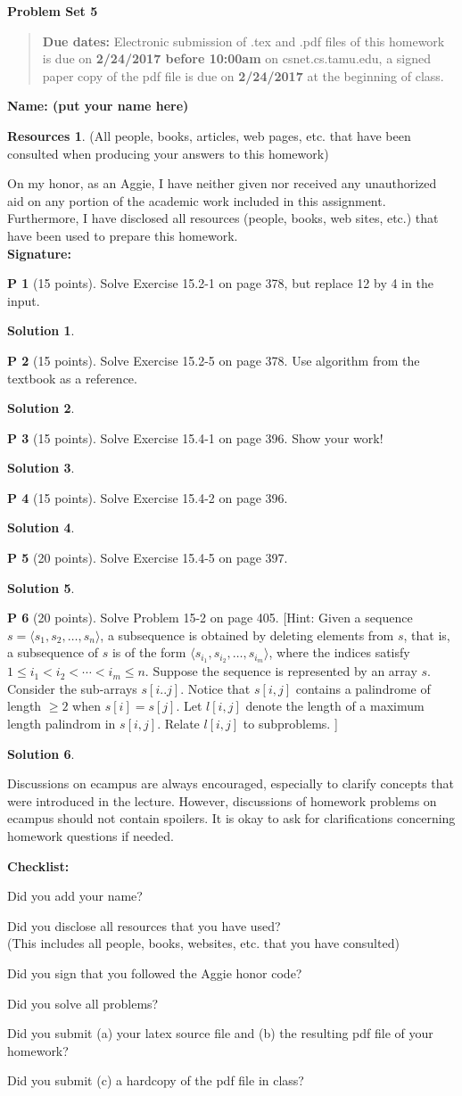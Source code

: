 \documentclass{article}
\theoremstyle{definition}
\newtheorem{problem}{P}
\newtheorem*{solution}{Solution}
\newtheorem*{resources}{Resources}
\newcommand{\name}[1]{\noindent\textbf{Name: #1}}
\newcommand{\honor}{\noindent On my honor, as an Aggie, I have neither
  given nor received any unauthorized aid on any portion of the
  academic work included in this assignment. Furthermore, I have
  disclosed all resources (people, books, web sites, etc.) that have
  been used to prepare this homework. \\[1ex]
 \textbf{Signature:} \underline{\hspace*{5cm}} }
\newcommand{\checklist}{\noindent\textbf{Checklist:}
\begin{compactitem}[$\Box$] 
\item Did you add your name? 
\item Did you disclose all resources that you have used? \\
(This includes all people, books, websites, etc. that you have consulted)
\item Did you sign that you followed the Aggie honor code? 
\item Did you solve all problems? 
\item Did you submit (a) your latex source file and (b) the resulting pdf file
  of your homework?
\item Did you submit (c) a hardcopy of the pdf file in class? 
\end{compactitem}
}
\newcommand{\problemset}[1]{\begin{center}\textbf{Problem Set #1}\end{center}}
\newcommand{\duedate}[2]{\begin{quote}\textbf{Due dates:} Electronic submission of .tex
    and .pdf files of this homework is due on \textbf{#1} on csnet.cs.tamu.edu, a signed paper copy
    of the pdf file is due on \textbf{#2} at the beginning of
    class. \end{quote} }
\begin{document}
\problemset{5}
\duedate{2/24/2017 before 10:00am}{2/24/2017}
\name{ (put your name here)}
\begin{resources} (All people, books, articles, web pages, etc. that
  have been consulted when producing your answers to this homework)
\end{resources}
\honor
\newpage


\begin{problem}[15 points]
Solve Exercise 15.2-1 on page 378, but replace 12 by 4 in the input. 
\end{problem}
\begin{solution}
\end{solution}

\begin{problem}[15 points]
Solve Exercise 15.2-5 on page 378. Use algorithm from the textbook as
a reference. 
\end{problem}
\begin{solution}
\end{solution}

\begin{problem}[15 points]
Solve Exercise 15.4-1 on page 396. Show your work!
\end{problem}
\begin{solution}
\end{solution}

\begin{problem}[15 points]
Solve Exercise 15.4-2 on page 396. 
\end{problem}
\begin{solution}
\end{solution}


\begin{problem}[20 points]
Solve Exercise 15.4-5 on page 397. 
\end{problem}
\begin{solution}
\end{solution}

\begin{problem}[20 points]
Solve Problem 15-2 on page 405. [Hint: Given a sequence $s= \langle s_1,
s_2, \ldots, s_n\rangle$, a subsequence is obtained by deleting
elements from $s$, that is, a subsequence of $s$ is of the form 
$ \langle s_{i_{1}}, s_{i_2}, \ldots, s_{i_m}\rangle$,
where the indices satisfy $1\le i_{1} < i_{2} < \cdots < i_{m} \le n$.  
Suppose the sequence is represented by an array $s$. 
Consider the
sub-arrays $s[i..j]$. Notice that $s[i,j]$ contains a palindrome of
length $\ge 2$ when $s[i]=s[j]$. Let $l[i,j]$ denote the length of a
maximum length palindrom in $s[i,j]$. Relate $l[i,j]$ to subproblems. ] 
\end{problem}
\begin{solution}
\end{solution}




Discussions on ecampus are always encouraged, especially to clarify
concepts that were introduced in the lecture. However, discussions of
homework problems on ecampus should not contain spoilers. It is okay to
ask for clarifications concerning homework questions if needed. 
\medskip

\goodbreak
\checklist
\end{document}
